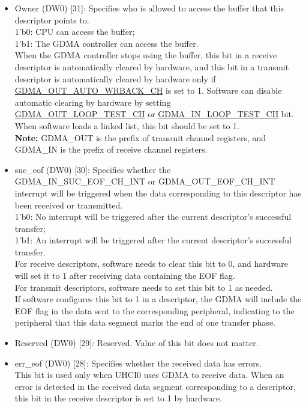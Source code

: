 \documentclass[main\_\_EN.tex]{subfiles}
\begin{document}
\begin{itemize}
    \item Owner (DW0) [31]: Specifies who is allowed to access the buffer that this descriptor points to.\\
    1'b0: CPU can access the buffer; \\
    1'b1: The GDMA controller can access the buffer.\\
    When the GDMA controller stops using the buffer, this bit in a receive descriptor is automatically cleared by hardware, and this bit in a transmit descriptor is automatically cleared by hardware only if \hyperref[fielddesc:GDMAOUTAUTOWRBACKCHN]{GDMA\_OUT\_AUTO\_WRBACK\_CH} is set to 1. Software can disable automatic clearing by hardware by setting \hyperref[fielddesc:GDMAOUTLOOPTESTCHN]{GDMA\_OUT\_LOOP\_TEST\_CH} or \hyperref[fielddesc:GDMAINLOOPTESTCHN]{GDMA\_IN\_LOOP\_TEST\_CH} bit. When software loads a linked list, this bit should be set to 1.
    \\{\bfseries Note:} GDMA\_OUT is the prefix of transmit channel registers, and GDMA\_IN is the prefix of receive channel registers.
    \item suc\_eof (DW0) [30]: Specifies whether the GDMA\_IN\_SUC\_EOF\_CH\_INT or GDMA\_OUT\_EOF\_CH\_INT interrupt will be triggered when the data corresponding to this descriptor has been received or transmitted.\\
    1'b0: No interrupt will be triggered after the current descriptor's successful transfer;\\
    1'b1: An interrupt will be triggered after the current descriptor's successful transfer.\\
    For receive descriptors, software needs to clear this bit to 0, and hardware will set it to 1 after receiving data containing the EOF flag.\\
    For transmit descriptors, software needs to set this bit to 1 as needed.\\
    If software configures this bit to 1 in a descriptor, the GDMA will include the EOF flag in the data sent to the corresponding peripheral, indicating to the peripheral that this data segment marks the end of one transfer phase.
    \item Reserved (DW0) [29]: Reserved. Value of this bit does not matter.
    \item err\_eof (DW0) [28]: Specifies whether the received data has errors.\\
    This bit is used only when UHCI0 uses GDMA to receive data. When an error is detected in the received data segment corresponding to a descriptor, this bit in the receive descriptor is set to 1 by hardware.

\end{itemize}
\end{document}
